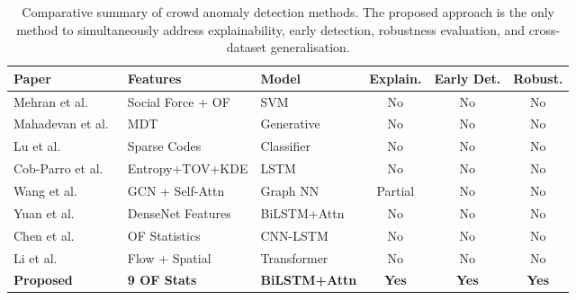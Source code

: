 \begin{table}[!t]
\centering
\caption{Comparative summary of crowd anomaly detection methods. The proposed approach is the only method to simultaneously address explainability, early detection, robustness evaluation, and cross-dataset generalisation.}
\label{tab:literature}
\footnotesize
\begin{tabular}{p{4.2cm}p{3.2cm}p{2.4cm}ccc}
\toprule
\textbf{Paper} & \textbf{Features} & \textbf{Model} & \textbf{Explain.} & \textbf{Early Det.} & \textbf{Robust.} \\
\midrule
Mehran et al.~\cite{mehran2009abnormal}      & Social Force + OF  & SVM        & No  & No  & No \\
Mahadevan et al.~\cite{mahadevan2010anomaly} & MDT                & Generative & No  & No  & No \\
Lu et al.~\cite{lu2013abnormal}              & Sparse Codes       & Classifier & No  & No  & No \\
Cob-Parro et al.~\cite{cobparro2021stampede} & Entropy+TOV+KDE    & LSTM       & No  & No  & No \\
Wang et al.~\cite{wang2023anomaly}           & GCN + Self-Attn    & Graph NN   & Partial & No & No \\
Yuan et al.~\cite{yuan2024crba}              & DenseNet Features  & BiLSTM+Attn & No & No & No \\
Chen et al.~\cite{chen2023opticalflow}       & OF Statistics      & CNN-LSTM   & No  & No  & No \\
Li et al.~\cite{li2024transformer}           & Flow + Spatial     & Transformer & No & No & No \\
\textbf{Proposed}                            & \textbf{9 OF Stats} & \textbf{BiLSTM+Attn} & \textbf{Yes} & \textbf{Yes} & \textbf{Yes} \\
\bottomrule
\end{tabular}
\end{table}

